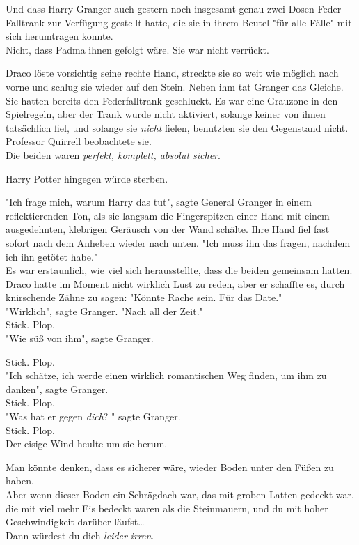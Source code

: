 {Und dass Harry Granger auch gestern noch insgesamt genau zwei Dosen Feder-Falltrank zur Verfügung gestellt hatte, die sie in ihrem Beutel "für alle Fälle" mit sich herumtragen konnte.\\ Nicht, dass Padma ihnen gefolgt wäre. Sie war nicht verrückt.

Draco löste vorsichtig seine rechte Hand, streckte sie so weit wie möglich nach vorne und schlug sie wieder auf den Stein. Neben ihm tat Granger das Gleiche.\\ Sie hatten bereits den Federfalltrank geschluckt. Es war eine Grauzone in den Spielregeln, aber der Trank wurde nicht aktiviert, solange keiner von ihnen tatsächlich fiel, und solange sie \emph{nicht} fielen, benutzten sie den Gegenstand nicht.\\ Professor Quirrell beobachtete sie.\\ Die beiden waren \emph{perfekt, komplett, absolut sicher}.

Harry Potter hingegen würde sterben.

"Ich frage mich, warum Harry das tut", sagte General Granger in einem reflektierenden Ton, als sie langsam die Fingerspitzen einer Hand mit einem ausgedehnten, klebrigen Geräusch von der Wand schälte. Ihre Hand fiel fast sofort nach dem Anheben wieder nach unten. "Ich muss ihn das fragen, nachdem ich ihn getötet habe."\\ Es war erstaunlich, wie viel sich herausstellte, dass die beiden gemeinsam hatten.\\ Draco hatte im Moment nicht wirklich Lust zu reden, aber er schaffte es, durch knirschende Zähne zu sagen: "Könnte Rache sein. Für das Date."\\ "Wirklich", sagte Granger. "Nach all der Zeit."\\ Stick. Plop.\\ "Wie süß von ihm", sagte Granger.

Stick. Plop.\\ "Ich schätze, ich werde einen wirklich romantischen Weg finden, um ihm zu danken", sagte Granger.\\ Stick. Plop.\\ "Was hat er gegen \emph{dich}? " sagte Granger.\\ Stick. Plop.\\ Der eisige Wind heulte um sie herum.

Man könnte denken, dass es sicherer wäre, wieder Boden unter den Füßen zu haben.\\ Aber wenn dieser Boden ein Schrägdach war, das mit groben Latten gedeckt war, die mit viel mehr Eis bedeckt waren als die Steinmauern, und du mit hoher Geschwindigkeit darüber läufst…\\ Dann würdest du dich \emph{leider} \emph{irren}.

}
